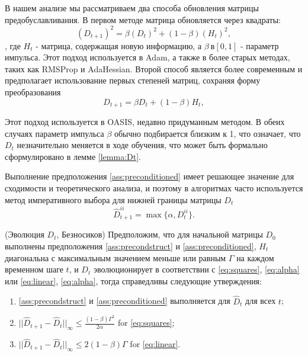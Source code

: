 В нашем анализе мы рассматриваем два способа обновления матрицы предобуславливания.
В первом методе матрица обновляется через квадраты:
\begin{equation}
\label{eq:squares}
    (D_{t+1})^2 = \beta (D_t)^2 + (1 - \beta) (H_t)^2,
\end{equation}
, где $H_t$ - матрица, содержащая новую информацию, а $\beta \ в [0, 1]$ - параметр импульса.
Этот подход используется в Adam, а также в более старых методах, таких как RMSProp и AdaHessian.
Второй способ является более современным и предполагает использование первых степеней матриц, сохраняя форму преобразования
\begin{equation}
\label{eq:linear}
    D_{t+1} = \beta D_t + (1 - \beta) H_t,
\end{equation}

Этот подход используется в OASIS, недавно придуманным методом. В обеих случаях параметр импульса $\beta$ обычно подбирается близким к 1, что означает, что $D_t$ незначительно меняется в ходе обучения, что может быть формально сформулировано в лемме \ref{lemma:Dt}.

Выполнение предположения \ref{ass:preconditioned} имеет решающее значение для сходимости и теоретического анализа, и поэтому в алгоритмах часто используется метод императивного выбора для нижней границы матрицы $D_t$
\begin{equation}
\label{eq:alpha}
    \hat{D}_{t+1}^{ii} = \max \{ \alpha, D_t^{ii} \}.
\end{equation}


\begin{lemma}
\label{lemma:Dt}
{(Эволюция $D_t$, Безносиков)}
    Предположим, что для начальной матрицы $D_0$ выполнены предположения \ref{ass:precondstruct} и \ref{ass:preconditioned}, $H_t$ диагональна с максимальным значением меньше или равным $\Gamma$ на каждом временном шаге $t$, и $D_t$ эволюционирует в соответствии с \eqref{eq:squares}, \eqref{eq:alpha} или 
    \eqref{eq:linear}, \eqref{eq:alpha},  тогда справедливы следующие утверждения:
    
    \begin{enumerate}
        \item \ref{ass:precondstruct} и \ref{ass:preconditioned} выполняется для $\hat{D}_t$ для всех $t$;
        \item $||\hat{D}_{t+1} - \hat{D}_t||_\infty \le \frac{(1 - \beta) \Gamma^2}{2\alpha}$ for \eqref{eq:squares};
        \item $||\hat{D}_{t+1} - \hat{D}_t||_\infty \le 2(1 - \beta) \Gamma$ for \eqref{eq:linear}.
    \end{enumerate}
\end{lemma}

